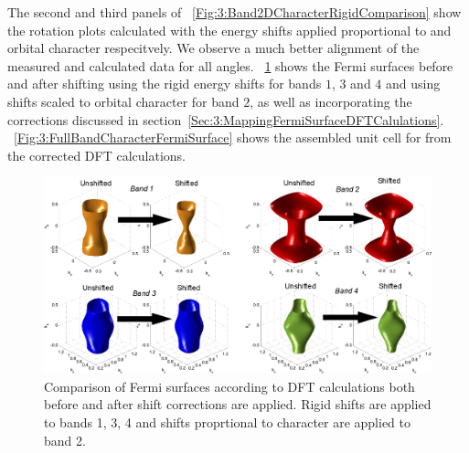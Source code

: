 {{{The second and third panels of \fig~\ref{Fig:3:Band2DCharacterRigidComparison} show the rotation plots calculated with the energy shifts applied proportional to \DzTwo and \DxzDyz orbital character respecitvely. We observe a much better alignment of the measured and calculated data for all angles. \Fig~\ref{Fig:3:BandCharacterFSShiftComparison} shows the Fermi surfaces before and after shifting using the rigid energy shifts for bands $1$, $3$ and $4$ and using shifts scaled to \DzTwo orbital character for band $2$, as well as incorporating the corrections discussed in section~\ref{Sec:3:MappingFermiSurfaceDFTCalulations}. \Fig~\ref{Fig:3:FullBandCharacterFermiSurface} shows the assembled unit cell for \BaFeP from the corrected DFT calculations.
\begin{figure}[h!]
    \begin{center}
        \includegraphics[scale=0.7]{Chapter3-dHvABaFe2P2/Figures/AngleDepMeasurements/BandCharacterFermiSurface/BandCharacterFermiSurfaceShiftComparison}
        \caption{Comparison of Fermi surfaces according to DFT calculations both before and after shift corrections are applied. Rigid shifts are applied to bands 1, 3, 4 and shifts proprtional to \DzTwo character are applied to band 2.}
        \label{Fig:3:BandCharacterFSShiftComparison}
    \end{center}
\end{figure}
\begin{figure}[h!]
    \begin{center}

\end{center}
\end{figure}}}}
